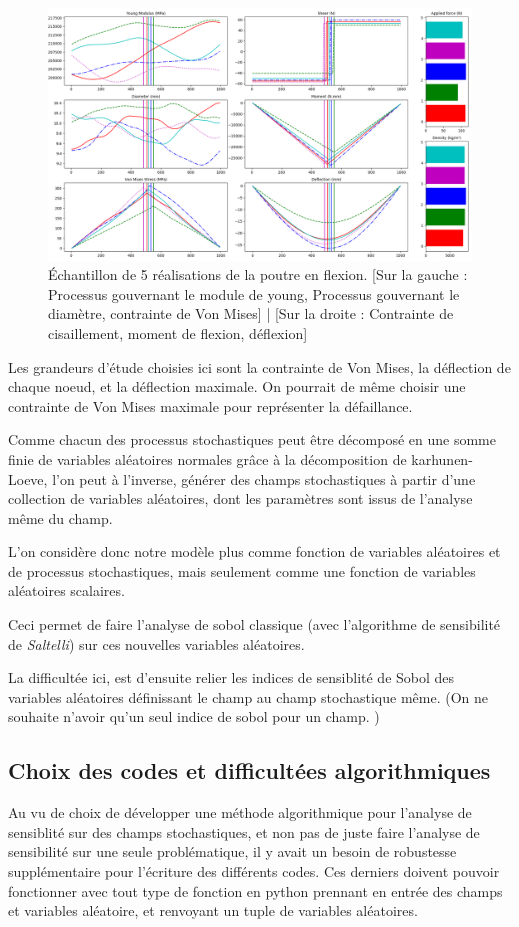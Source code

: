 \documentclass[a4paper,10pt]{article}
\begin{document}
\begin{figure}[H]
   \centering   
   \includegraphics[scale=0.33]{beam_experience.png}
      \caption{Échantillon de 5 réalisations de la poutre en flexion. [Sur la gauche : Processus gouvernant le module de young, Processus gouvernant le diamètre, contrainte de Von Mises] | [Sur la droite : Contrainte de cisaillement, moment de flexion, déflexion] }
         \label{beamExperience}
\end{figure}

Les grandeurs d'étude choisies ici sont la contrainte de Von Mises, la déflection de chaque noeud, et la déflection maximale. On pourrait de même choisir une contrainte de Von Mises maximale pour représenter la défaillance. 

Comme chacun des processus stochastiques peut être décomposé en une somme finie de variables aléatoires normales grâce à la décomposition de karhunen-Loeve, l'on peut à l'inverse, générer des champs stochastiques à partir d'une collection de variables aléatoires, dont les paramètres sont issus de l'analyse même du champ.

L'on considère donc notre modèle plus comme fonction de variables aléatoires et de processus stochastiques, mais seulement comme une fonction de variables aléatoires scalaires.

Ceci permet de faire l'analyse de sobol classique (avec l'algorithme de sensibilité de \textit{Saltelli}) sur ces nouvelles variables aléatoires.

La difficultée ici, est d'ensuite relier les indices de sensiblité de Sobol des variables aléatoires définissant le champ au champ stochastique même. (On ne souhaite n'avoir qu'un seul indice de sobol pour un champ. ) 

\subsection{Choix des codes et difficultées algorithmiques}
Au vu de choix de développer une méthode algorithmique pour l'analyse de sensiblité sur des champs stochastiques, et non pas de juste faire l'analyse de sensibilité sur une seule problématique, il y avait un besoin de robustesse supplémentaire pour l'écriture des différents codes. Ces derniers doivent pouvoir fonctionner avec tout type de fonction en python prennant en entrée des champs et variables aléatoire, et renvoyant un tuple de variables aléatoires. 
\end{document}
